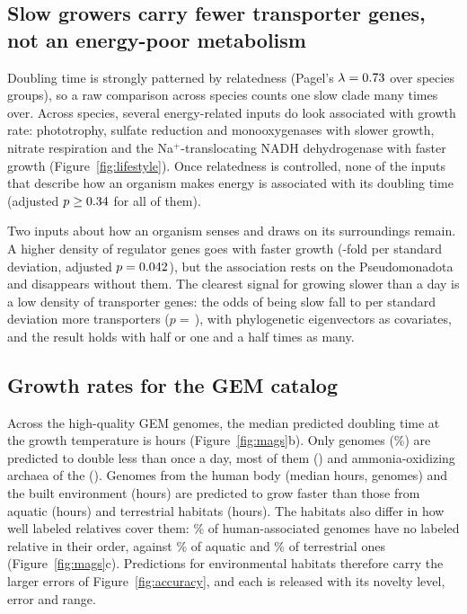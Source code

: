 \subsection{Slow growers carry fewer transporter genes, not an energy-poor metabolism}
Doubling time is strongly patterned by relatedness (Pagel's $\lambda=0.73$ over \PglsNGroups species groups), so a raw
comparison across species counts one slow clade many times over. Across species, several energy-related inputs do look
associated with growth rate: phototrophy, sulfate reduction and monooxygenases with slower growth, nitrate respiration and the
Na$^+$-translocating NADH dehydrogenase with faster growth (Figure~\ref{fig:lifestyle}). Once relatedness is controlled, none
of the inputs that describe how an organism makes energy is associated with its doubling time (adjusted $p\ge0.34$
for all of them).

Two inputs about how an organism senses and draws on its surroundings remain. A higher density of regulator genes goes with
faster growth (\PglsRegFold-fold per standard deviation, adjusted $p=0.042$), but the association rests on the
Pseudomonadota and disappears without them. The clearest signal for growing slower than a day is a low density of transporter
genes: the odds of being slow fall to \SlowTransporterOR per standard deviation more transporters ($p=$\,\SlowTransporterP),
with \KEigen phylogenetic eigenvectors as covariates, and the result holds with half or one and a half times as many.

\subsection{Growth rates for the GEM catalog}
Across the \NGEMPredicted high-quality GEM genomes, the median predicted doubling time at the growth temperature is
\GEMMedianHours hours (Figure~\ref{fig:mags}b). Only \GEMNSlow genomes (\GEMShareSlow\%) are predicted to double less than
once a day, most of them \GEMSlowTopOrder (\GEMSlowTopOrderN) and ammonia-oxidizing archaea of the \GEMSlowSecondOrder
(\GEMSlowSecondOrderN). Genomes from the human body (median \GEMMedianHuman hours, \GEMNHuman genomes) and the built
environment (\GEMMedianBuilt hours) are predicted to grow faster than those from aquatic (\GEMMedianAquatic hours) and
terrestrial habitats (\GEMMedianTerrestrial hours). The habitats also differ in how well labeled relatives cover them:
\GEMNewOrderHuman\% of human-associated genomes have no labeled relative in their order, against \GEMNewOrderAquatic\% of
aquatic and \GEMNewOrderTerrestrial\% of terrestrial ones (Figure~\ref{fig:mags}c). Predictions for environmental habitats
therefore carry the larger errors of Figure~\ref{fig:accuracy}, and each is released with its novelty level, error and range.
